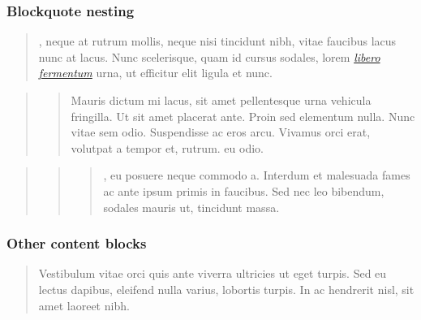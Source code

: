 \documentclass[letterpaper,10pt,english]{sphinxmanual}
\begin{document}
\subsubsection{Blockquote nesting}
\label{\detokenize{markdown:blockquote-nesting}}\begin{quote}

, neque at rutrum mollis, neque nisi tincidunt nibh, vitae
faucibus lacus nunc at lacus. Nunc scelerisque, quam id cursus sodales, lorem
{\hyperref[\detokenize{markdown:}]{\emph{libero fermentum}}} urna, ut efficitur elit ligula et nunc.
\end{quote}
\begin{quote}
\begin{quote}

Mauris dictum mi lacus, sit amet pellentesque urna vehicula fringilla.
Ut sit amet placerat ante. Proin sed elementum nulla. Nunc vitae sem odio.
Suspendisse ac eros arcu. Vivamus orci erat, volutpat a tempor et, rutrum.
eu odio.
\end{quote}
\end{quote}
\begin{quote}
\begin{quote}
\begin{quote}

, eu posuere neque commodo a.
Interdum et malesuada fames ac ante ipsum primis in faucibus. Sed nec leo
bibendum, sodales mauris ut, tincidunt massa.
\end{quote}
\end{quote}
\end{quote}


\subsubsection{Other content blocks}
\label{\detokenize{markdown:other-content-blocks}}\begin{quote}

Vestibulum vitae orci quis ante viverra ultricies ut eget turpis. Sed eu
lectus dapibus, eleifend nulla varius, lobortis turpis. In ac hendrerit nisl,
sit amet laoreet nibh.
\end{quote}
\end{document}
